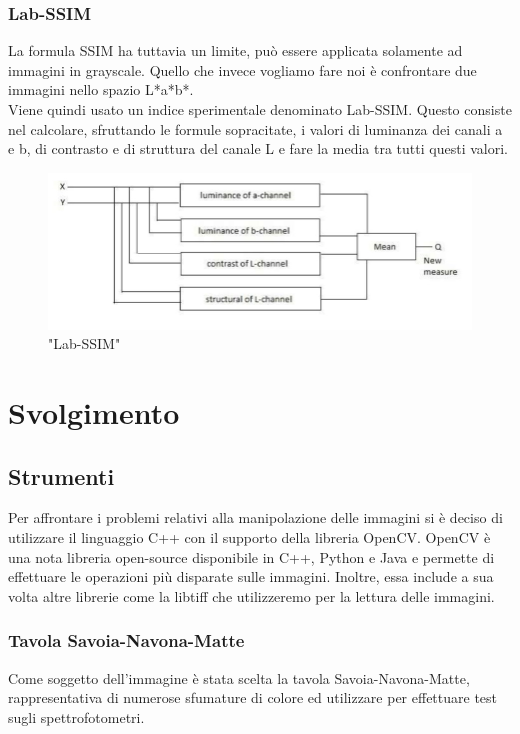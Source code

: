\documentclass[a4paper,11pt]{article}
\begin{document}
    \subsubsection{Lab-SSIM}
    La formula SSIM ha tuttavia un limite, può essere applicata solamente ad immagini in grayscale. Quello che invece vogliamo fare noi è confrontare due immagini nello spazio L*a*b*. \\
    Viene quindi usato un indice sperimentale denominato Lab-SSIM. Questo consiste nel calcolare, sfruttando le formule sopracitate, i valori di luminanza dei canali a e b, di contrasto e di struttura del canale L e fare la media tra tutti questi valori.

    \begin{figure}[h]
        \centering
        \includegraphics[scale=0.8]{labssim.png}
        \caption{"Lab-SSIM"}
    \end{figure}

    \newpage


    \section{Svolgimento}

    \subsection{Strumenti}
    Per affrontare i problemi relativi alla manipolazione delle immagini si è deciso di utilizzare il linguaggio C++ con il supporto della libreria OpenCV.
    OpenCV è una nota libreria open-source disponibile in C++, Python e Java e permette di effettuare le operazioni più disparate sulle immagini.
    Inoltre, essa include a sua volta altre librerie come la libtiff che utilizzeremo per la lettura delle immagini.
    
    \subsubsection{Tavola Savoia-Navona-Matte}
    Come soggetto dell'immagine è stata scelta la tavola Savoia-Navona-Matte, rappresentativa di numerose sfumature di colore ed utilizzare per effettuare test sugli spettrofotometri.
\end{document}
